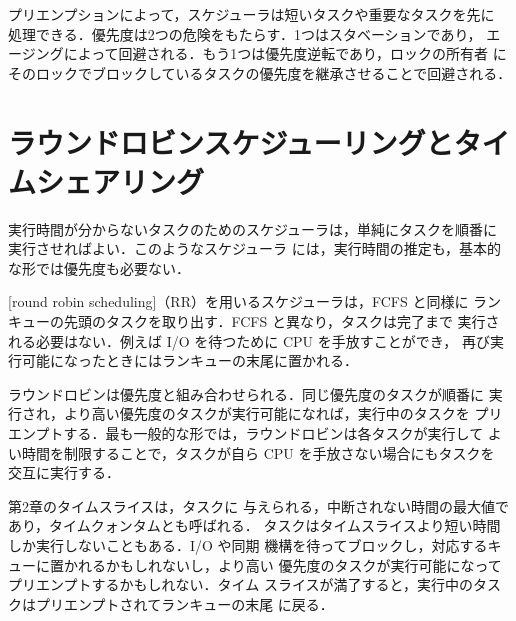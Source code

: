 \documentclass[../main.tex]{subfiles}
\begin{document}
\begin{keypoint}
  プリエンプションによって，スケジューラは短いタスクや重要なタスクを先に
  処理できる．優先度は2つの危険をもたらす．1つはスタベーションであり，
  エージングによって回避される．もう1つは優先度逆転であり，ロックの所有者
  にそのロックでブロックしているタスクの優先度を継承させることで回避される．%
\end{keypoint}

\section{ラウンドロビンスケジューリングとタイムシェアリング}
\label{sec:l07-rr}

実行時間が分からないタスクのためのスケジューラは，単純にタスクを順番に
実行させればよい．このようなスケジューラ
には，実行時間の推定も，基本的な形では優先度も必要ない．

\begin{definition}[ラウンドロビン]
  [round robin scheduling]（RR）を用いるスケジューラは，FCFS と同様に
  ランキューの先頭のタスクを取り出す．FCFS と異なり，タスクは完了まで
  実行される必要はない．例えば I/O を待つために CPU を手放すことができ，
  再び実行可能になったときにはランキューの末尾に置かれる．
\end{definition}

ラウンドロビンは優先度と組み合わせられる．同じ優先度のタスクが順番に
実行され，より高い優先度のタスクが実行可能になれば，実行中のタスクを
プリエンプトする．最も一般的な形では，ラウンドロビンは各タスクが実行して
よい時間を制限することで，タスクが自ら CPU を手放さない場合にもタスクを
交互に実行する．

第2章のタイムスライスは，タスクに
与えられる，中断されない時間の最大値であり，タイムクォンタムとも呼ばれる．%
%
タスクはタイムスライスより短い時間しか実行しないこともある．I/O や同期
機構を待ってブロックし，対応するキューに置かれるかもしれないし，より高い
優先度のタスクが実行可能になってプリエンプトするかもしれない．タイム
スライスが満了すると，実行中のタスクはプリエンプトされてランキューの末尾
に戻る．
\end{document}
